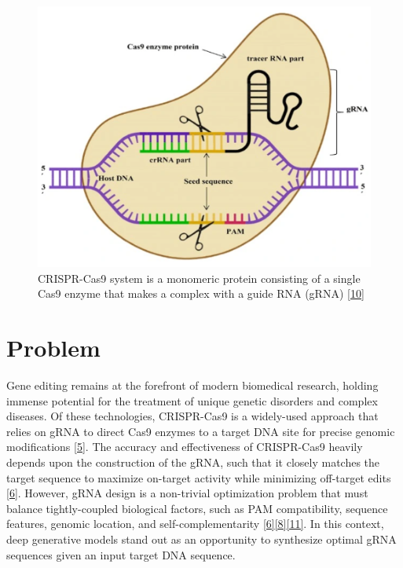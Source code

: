 \documentclass{article}
\begin{document}
\begin{figure}[H]
    \centering
    \begin{minipage}{0.32\textwidth}
        \includegraphics[width=\linewidth]{Pictures/CRISPR_Cas9.png} 
    \end{minipage}
    \caption{CRISPR-Cas9 system is a monomeric protein consisting of a single Cas9 enzyme that makes a complex with a guide RNA (gRNA) \hyperref[Reference 10]{[10]}} 
\end{figure}

\vspace{-1em}

\section{Problem}
Gene editing remains at the forefront of modern biomedical research, holding immense potential for the treatment of unique genetic disorders and complex diseases. Of these technologies, CRISPR-Cas9 is a widely-used approach that relies on gRNA to direct Cas9 enzymes to a target DNA site for precise genomic modifications \hyperref[Reference 5]{[5]}. The accuracy and effectiveness of CRISPR-Cas9 heavily depends upon the construction of the gRNA, such that it closely matches the target sequence to maximize on-target activity while minimizing off-target edits \hyperref[Reference 6]{[6]}. However, gRNA design is a non-trivial optimization problem that must balance tightly-coupled biological factors, such as PAM compatibility, sequence features, genomic location, and self-complementarity \hyperref[Reference 6]{[6]}\hyperref[Reference 8]{[8]}\hyperref[Reference 11]{[11]}. In this context, deep generative models stand out as an opportunity to synthesize optimal gRNA sequences given an input target DNA sequence.  
\end{document}
